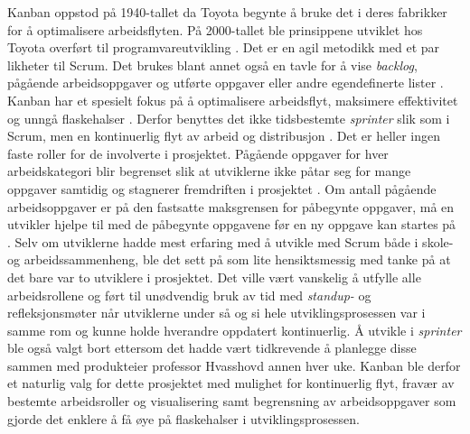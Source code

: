 Kanban oppstod på 1940-tallet da Toyota begynte å bruke det i deres fabrikker for å optimalisere arbeidsflyten. På 2000-tallet ble prinsippene utviklet hos Toyota overført til programvareutvikling \cite{radiganKanbanBriefIntroduction}. Det er en agil metodikk med et par likheter til Scrum. Det brukes blant annet også en tavle for å vise \textit{backlog}, pågående arbeidsoppgaver og utførte oppgaver eller andre egendefinerte lister \cite{radiganKanbanBriefIntroduction}. Kanban har et spesielt fokus på å optimalisere arbeidsflyt, maksimere effektivitet og unngå flaskehalser \cite{radiganKanbanBriefIntroduction}. Derfor benyttes det ikke tidsbestemte \textit{sprinter} slik som i Scrum, men en kontinuerlig flyt av arbeid og distribusjon \cite{radiganKanbanBriefIntroduction}. Det er heller ingen faste roller for de involverte i prosjektet. Pågående oppgaver for hver arbeidskategori blir begrenset slik at utviklerne ikke påtar seg for mange oppgaver samtidig og stagnerer fremdriften i prosjektet \cite{radiganKanbanBriefIntroduction}. Om antall pågående arbeidsoppgaver er på den fastsatte maksgrensen for påbegynte oppgaver, må en utvikler hjelpe til med de påbegynte oppgavene før en ny oppgave kan startes på \cite{radiganKanbanBriefIntroduction}. 
\newline
\newline
Selv om utviklerne hadde mest erfaring med å utvikle med Scrum både i skole- og arbeidssammenheng, ble det sett på som lite hensiktsmessig med tanke på at det bare var to utviklere i prosjektet. Det ville vært vanskelig å utfylle alle arbeidsrollene og ført til unødvendig bruk av tid med \textit{standup-} og refleksjonsmøter når utviklerne under så og si hele utviklingsprosessen var i samme rom og kunne holde hverandre oppdatert kontinuerlig. Å utvikle i \textit{sprinter} ble også valgt bort ettersom det hadde vært tidkrevende å planlegge disse sammen med produkteier professor Hvasshovd annen hver uke. Kanban ble derfor et naturlig valg for dette prosjektet med mulighet for kontinuerlig flyt, fravær av bestemte arbeidsroller og visualisering samt begrensning av arbeidsoppgaver som gjorde det enklere å få øye på flaskehalser i utviklingsprosessen. 

